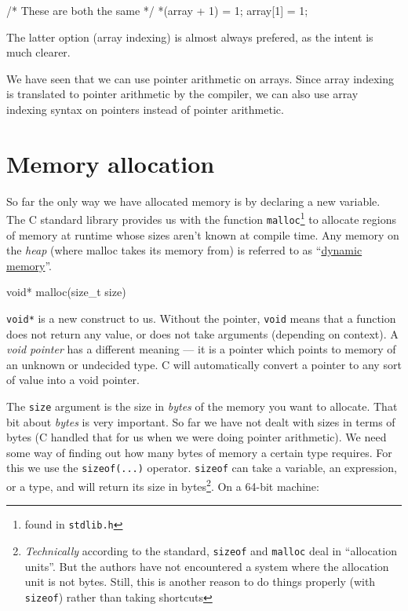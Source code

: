 \begin{codeblock}
/* These are both the same */
*(array + 1) = 1;
array[1] = 1; 
\end{codeblock}

The latter option (array indexing) is almost always prefered, as the intent is much clearer.

We have seen that we can use pointer arithmetic on arrays.
Since array indexing is translated to pointer arithmetic by the compiler, we can also use array indexing syntax on pointers instead of pointer arithmetic.

\section{Memory allocation}

So far the only way we have allocated memory is by declaring a new variable.
The C standard library provides us with the function \lstinline!malloc!\footnote{found in \lstinline{stdlib.h}} to allocate regions of memory at 
runtime whose sizes aren't known at compile time.
Any memory on the \emph{heap} (where malloc takes its memory from) is referred to as ``\hyperlink{defn:dynamicmemory}{dynamic memory}''.

\begin{codeinline}
void* malloc(size_t size)
\end{codeinline}

\lstinline!void*! is a new construct to us.
Without the pointer, \lstinline!void! means that a function does not return any value, or does not take arguments (depending on context).
A \emph{void pointer} has a different meaning --- it is a pointer which points to memory of an unknown or undecided type.
C will automatically convert a pointer to any sort of value into a void pointer.

The \texttt{size} argument is the size in \emph{bytes} of the memory you want to allocate.
That bit about \emph{bytes} is very important.
So far we have not dealt with sizes in terms of bytes (C handled that for us when we were doing pointer arithmetic).
We need some way of finding out how many bytes of memory a certain type requires.
For this we use the \lstinline!sizeof(...)! operator.
\lstinline!sizeof! can take a variable, an expression, or a type, and will return its size in bytes\footnote{\emph{Technically} according to the standard, \lstinline!sizeof!
and \lstinline!malloc! deal in ``allocation units''. But the authors have not encountered a system where the allocation unit is not bytes.
Still, this is another reason to do things properly (with \lstinline!sizeof!) rather than taking shortcuts}.
On a 64-bit machine:

